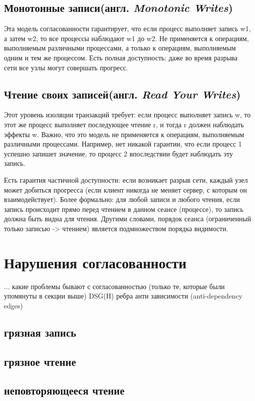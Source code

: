 \documentclass[12pt,  openany]{book}
\begin{document}
\subsection{Монотонные записи(англ.  \textit{Monotonic Writes})}
Эта модель согласованности гарантирует, что если процесс выполняет запись w1,  а затем w2, то все процессы наблюдают w1 до w2. Не применяется к операциям, выполняемым различными процессами, а только к  операциям, выполняемым одним и тем же процессом.
Есть полная доступность: даже во время разрыва сети все узлы могут совершать прогресс.

\subsection{Чтение своих записей(англ.  \textit{Read Your Writes})}
Этот уровень изоляции транзакций требует: если процесс выполняет запись w, то этот же процесс выполняет последующее чтение r, и тогда r должен наблюдать эффекты w.
Важно, что это модель не применяется к операциям, выполняемым различными процессами. Например, нет никакой гарантии, что если процесс 1 успешно запишет значение, то процесс 2 впоследствии будет наблюдать эту запись.
\par
Есть гарантия частичной доступности: если возникает разрыв сети, каждый узел может добиться прогресса (если клиент никогда не меняет сервер, с которым он взаимодействует).
Более формально: для любой записи и любого чтения, если запись происходит прямо перед чтением в данном сеансе (процессе), то запись должна быть видна для чтения. Другими словами, порядок сеанса (ограниченный только записью -> чтением) является подмножеством порядка видимости.


\section{Нарушения согласованности}
... какие проблемы бывают с согласованностью
(только те, которые были упомянуты в секции выше)
DSG(H)
\newline
ребра анти зависимости (anti-dependency edges)

\subsection{грязная запись}
\subsection{грязное чтение}
\subsection{неповторяющееся чтение}
\end{document}
